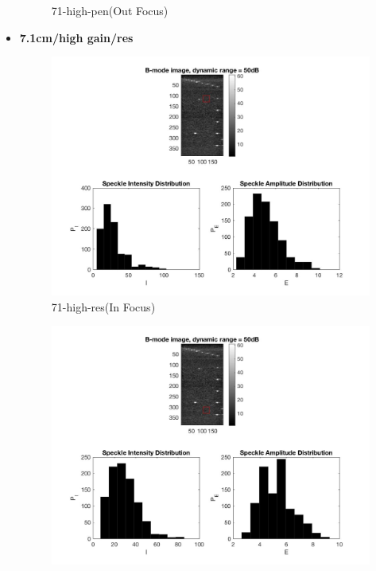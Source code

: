 \documentclass[12pts,a4paper]{article}
\begin{document}
\begin{itemize}
\begin{figure}[h]
    \caption{71-high-pen(Out Focus)}
    \label{fig:mesh1}
\end{figure}
\pagebreak
\item{\textbf{7.1cm/high gain/res}}
\begin{center}
\end{center}
\begin{figure}[h]
    \centering
    \includegraphics[width=1.0\textwidth]{img_hw2/71-high-res1.jpg}
    \caption{71-high-res(In Focus)}
    \label{fig:mesh1}
\end{figure}
\pagebreak
\begin{figure}[h]
    \centering
    \includegraphics[width=1.0\textwidth]{img_hw2/71-high-res2.jpg}

\end{figure}
\end{itemize}
\end{document}

